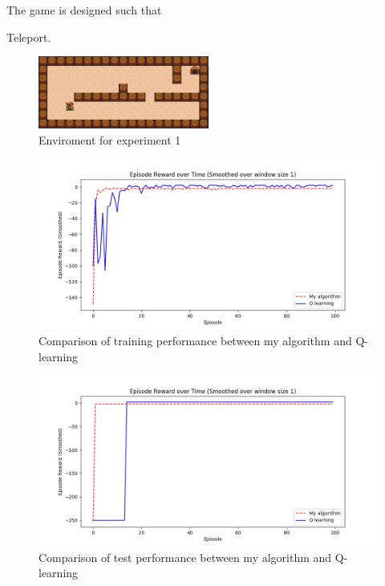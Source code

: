 The game is designed such that 

Teleport. 

\begin{figure}[!htb]
\centering
\includegraphics[width=0.5\textwidth]{./figures/experiment1}
\caption{Enviroment for experiment 1}
\label{experiment1}
\end{figure}
    

\begin{figure}[!htb]
\centering
\includegraphics[width=1.0\textwidth]{./figures/experiment3_training}
\caption{Comparison of training performance between my algorithm and Q-learning}
\label{experiment1_training}
\end{figure}

\begin{figure}[!htb]
\centering
\includegraphics[width=1.0\textwidth]{./figures/experiment3_test}
\caption{Comparison of test performance between my algorithm and Q-learning}
\label{experiment1_test}
\end{figure}
        
